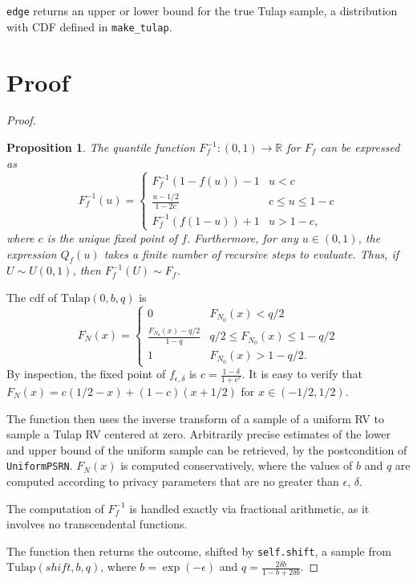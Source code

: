 \documentclass{article}
\newtheorem{prop}{Proposition}
\begin{document}
\texttt{edge} returns an upper or lower bound for the true Tulap sample,
a distribution with CDF defined in \texttt{make\_tulap}.

\section{Proof}

\begin{proof} 

\begin{prop}\label{prop1}   %
    The quantile function $F_f^{-1}:(0,1)\rightarrow \mathbb{R}$ for $F_f$ can be expressed as
    \[F_f^{-1}(u) = \begin{cases}
    F_f^{-1}(1-f(u))-1&u<c\\
    \frac{u-1/2}{1-2c}&c\leq u\leq 1-c\\
    F_f^{-1}(f(1-u))+1&u>1-c,
    \end{cases}\]
    where $c$ is the unique fixed point of $f$. 
    {Furthermore, for any $u\in (0,1)$, the expression $Q_f(u)$ takes a finite number of recursive steps to evaluate. Thus,} 
    if $U\sim U(0,1)$, then $F_f^{-1}(U) \sim F_f$. 
\end{prop}

The cdf of $\mathrm{Tulap}(0,b,q)$ is
\[F_N(x) = \begin{cases}
    0&F_{N_0}(x)<q/2\\
    \frac{F_{N_0}(x)-q/2}{1-q}& q/2\leq F_{N_0}(x)\leq 1-q/2\\
    1&F_{N_0}(x)>1-q/2.
\end{cases}\]
By inspection, the fixed point of $f_{\epsilon,\delta}$ is $c=\frac{1-\delta}{1+e^\epsilon}$. 
It is easy to verify that $F_N(x) = c(1/2-x) + (1-c)(x+1/2)$ for $x\in (-1/2,1/2)$. 

The function then uses the inverse transform of a sample of a uniform RV to sample a Tulap RV centered at zero.
Arbitrarily precise estimates of the lower and upper bound of the uniform sample can be retrieved, 
by the postcondition of \texttt{UniformPSRN}.
$F_N(x)$ is computed conservatively, 
where the values of $b$ and $q$ are computed according to privacy parameters that are no greater than $\epsilon$, $\delta$.

The computation of $F_f^{-1}$ is handled exactly via fractional arithmetic, 
as it involves no transcendental functions.

The function then returns the outcome, shifted by \texttt{self.shift}, a sample from $\mathrm{Tulap}(shift,b,q)$,
where $b = \exp(-\epsilon)$ and $q = \frac{2\delta b}{1-b+2\delta b}$.


\end{proof}
\end{document}
